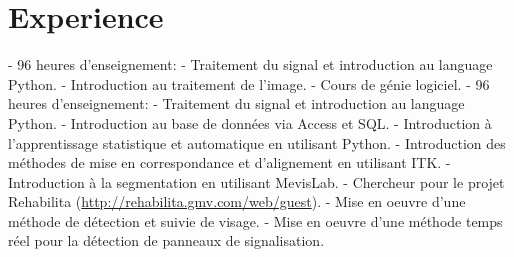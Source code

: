 \documentclass[11pt,a4paper,sans]{moderncv} %
\begin{document}
\section{\textbf{Experience}}
{- 96 heures d'enseignement:\newline
 - Traitement du signal et introduction au language Python.\newline
 - Introduction au traitement de l'image.\newline
 - Cours de g\'enie logiciel.}
{}
{- 96 heures d'enseignement:\newline
 - Traitement du signal et introduction au language Python.\newline
 - Introduction au base de donn\'ees via Access et SQL.\newline
 - Introduction \`a l'apprentissage statistique et automatique en utilisant Python.}
{- Introduction des m\'ethodes de mise en correspondance et d'alignement en utilisant ITK.\newline
 - Introduction \`a la segmentation en utilisant MevisLab.}
{- Chercheur pour le projet Rehabilita (\url{http://rehabilita.gmv.com/web/guest}).\newline
 - Mise en oeuvre d'une m\'ethode de d\'etection et suivie de visage.\newline
 - Mise en oeuvre d'une m\'ethode temps r\'eel pour la d\'etection de panneaux de signalisation.}
\end{document}
